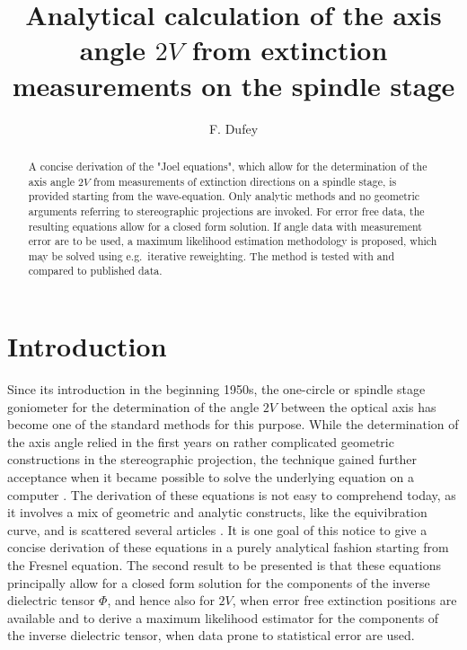 \documentclass{article}
\begin{document}
\title{Analytical calculation of the axis angle $2V$ from extinction measurements on the spindle stage}
\author{F. Dufey}
\maketitle
\begin{abstract}
	A concise derivation of the "Joel equations", which allow for the determination of the axis angle $2V$ from measurements of extinction directions on a spindle stage, is provided starting from the wave-equation. 
	Only analytic methods and no geometric arguments referring to stereographic projections are invoked. 
	For error free data, the resulting equations allow for a closed form solution.  
	If angle data with measurement error are to be used, a maximum likelihood estimation methodology is proposed, which may be solved using e.g.\ iterative reweighting. 
	The method is tested with and compared to  published data. 
\end{abstract}
\section{Introduction}

Since its introduction in the beginning 1950s,  the one-circle or spindle stage goniometer for the determination of the angle $2V$ between the optical axis has become one of the standard methods for this purpose. 
While the determination of the axis angle relied in the first years on rather complicated geometric constructions in the stereographic projection, the technique gained further acceptance when it became possible to solve the underlying equation on a computer \cite{joel1965determination,bloss1973computer,bartelmehs1992excalibr}. 
The derivation of these equations is not easy to comprehend today, as it involves a mix of geometric and analytic constructs, like the equivibration curve,  and is scattered several articles \cite{joel1957theextinction, garaycochea1964determination, joel1963determination,joel1965determination}. 
It is one goal of this notice to give a concise derivation of these equations in a purely analytical fashion starting from the Fresnel equation. 
The second result to be presented is that these equations principally allow for a closed form solution for the components of the inverse dielectric tensor $\Phi$, and hence also for $2V$, when error free extinction positions are available and to derive a maximum likelihood estimator for the components of the inverse dielectric tensor, when data prone to statistical error are used. 
\end{document}
